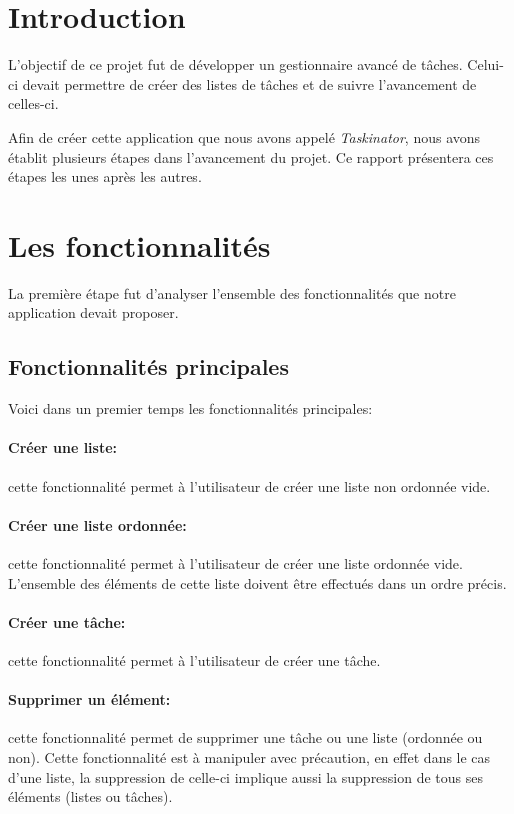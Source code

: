 \documentclass[a4paper,10pt]{article}
\begin{document}
\section{Introduction}
L'objectif de ce projet fut de développer un gestionnaire avancé de tâches. Celui-ci devait permettre de créer des listes de tâches et de suivre l'avancement
de celles-ci.

Afin de créer cette application que nous avons appelé \textit{Taskinator}, nous avons établit plusieurs étapes dans l'avancement du projet. Ce rapport
présentera  ces étapes  les unes après  les autres.

\newpage
\section{Les fonctionnalités}
La première étape fut d'analyser l'ensemble des fonctionnalités que notre application devait proposer. 

\subsection{Fonctionnalités principales}
Voici dans un premier temps les fonctionnalités principales:
\paragraph{Créer une liste:} cette fonctionnalité permet à l'utilisateur de créer une liste non ordonnée vide.
\paragraph{Créer une liste ordonnée:} cette fonctionnalité permet à l'utilisateur de créer une liste ordonnée vide. L'ensemble des éléments de cette liste
doivent être effectués dans un ordre précis.
\paragraph{Créer une tâche:} cette fonctionnalité permet à l'utilisateur de créer une tâche.
\paragraph{Supprimer un élément:} cette fonctionnalité permet de supprimer une tâche ou une liste (ordonnée ou non). Cette fonctionnalité est à manipuler avec
précaution, en effet dans le cas d'une liste, la suppression de celle-ci implique aussi la suppression de tous ses éléments (listes ou tâches).
\end{document}
